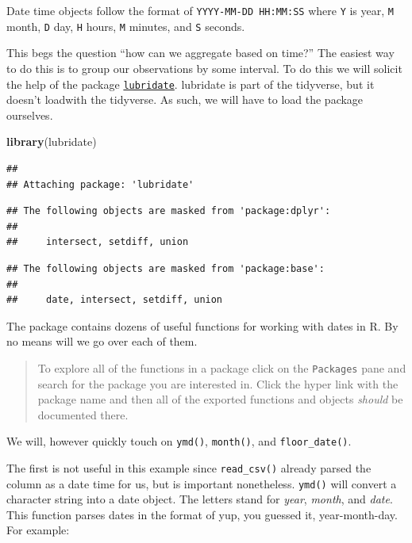 \documentclass[
]{book}
\newenvironment{Shaded}{\begin{snugshade}}{\end{snugshade}}
\newcommand{\KeywordTok}[1]{\textcolor[rgb]{0.13,0.29,0.53}{\textbf{#1}}}
\newcommand{\NormalTok}[1]{#1}
\begin{document}
Date time objects follow the format of \texttt{YYYY-MM-DD\ HH:MM:SS} where \texttt{Y} is year, \texttt{M} month, \texttt{D} day, \texttt{H} hours, \texttt{M} minutes, and \texttt{S} seconds.

This begs the question ``how can we aggregate based on time?'' The easiest way to do this is to group our observations by some interval. To do this we will solicit the help of the package \href{https://lubridate.tidyverse.org}{\texttt{lubridate}}. lubridate is part of the tidyverse, but it doesn't loadwith the tidyverse. As such, we will have to load the package ourselves.

\begin{Shaded}
\begin{Highlighting}[]
\KeywordTok{library}\NormalTok{(lubridate)}
\end{Highlighting}
\end{Shaded}

\begin{verbatim}
## 
## Attaching package: 'lubridate'
\end{verbatim}

\begin{verbatim}
## The following objects are masked from 'package:dplyr':
## 
##     intersect, setdiff, union
\end{verbatim}

\begin{verbatim}
## The following objects are masked from 'package:base':
## 
##     date, intersect, setdiff, union
\end{verbatim}

The package contains dozens of useful functions for working with dates in R. By no means will we go over each of them.

\begin{quote}
To explore all of the functions in a package click on the \texttt{Packages} pane and search for the package you are interested in. Click the hyper link with the package name and then all of the exported functions and objects \emph{should} be documented there.
\end{quote}

We will, however quickly touch on \texttt{ymd()}, \texttt{month()}, and \texttt{floor\_date()}.

The first is not useful in this example since \texttt{read\_csv()} already parsed the column as a date time for us, but is important nonetheless. \texttt{ymd()} will convert a character string into a date object. The letters stand for \emph{year}, \emph{month}, and \emph{date}. This function parses dates in the format of yup, you guessed it, year-month-day. For example:
\end{document}
